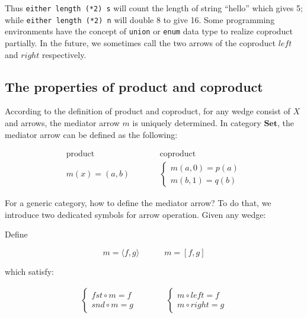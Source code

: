 \documentclass{article}
\begin{document}
Thus \texttt{either length (*2) s} will count the length of string ``hello'' which gives 5; while \texttt{either length (*2) n} will double 8 to give 16. Some programming environments have the concept of \texttt{union} or \texttt{enum} data type to realize coproduct partially. In the future, we sometimes call the two arrows of the coproduct $left$ and $right$ respectively.

\subsection{The properties of product and coproduct}

According to the definition of product and coproduct, for any wedge consist of $X$ and arrows, the mediator arrow $m$ is uniquely determined. In category $\pmb{Set}$, the mediator arrow can be defined as the following:

\[
\begin{array}{ccc}
\text{product} & & \text{coproduct} \\
m(x) = (a, b) & \quad \quad &
\begin{cases}
m (a, 0) = p(a) \\
m (b, 1) = q(b)
\end{cases}
\end{array}
\]

For a generic category, how to define the mediator arrow? To do that, we introduce two dedicated symbols for arrow operation. Given any wedge:

\begin{center}
\end{center}

Define

\[
m = \langle f, g \rangle \quad \quad \quad m =[f, g]
\]

which satisfy:

\[
\begin{array}{rcl}
\begin{cases}
fst \circ m = f \\
snd \circ m = g
\end{cases}
& \quad \quad &
\begin{cases}
m \circ left = f \\
m \circ right = g
\end{cases}
\end{array}
\]
\end{document}
